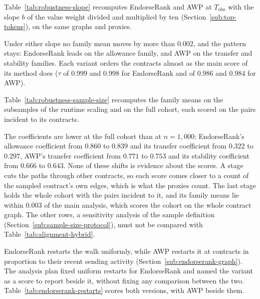 
Table~\ref{tab:robustness-slope} recomputes EndorseRank and AWP at $T_{\mathrm{obs}}$ with the slope $b$ of the value weight divided and multiplied by ten (Section~\ref{sub:top-tokens}), on the same graphs and proxies.



Under either slope no family mean moves by more than $0.002$, and the pattern stays: EndorseRank leads on the allowance family, and AWP on the transfer and stability families. Each variant orders the contracts almost as the main score of its method does ($\tau$ of $0.999$ and $0.998$ for EndorseRank and of $0.986$ and $0.984$ for AWP).


Table~\ref{tab:robustness-sample-size} recomputes the family means on the subsamples of the runtime scaling and on the full cohort, each scored on the pairs incident to its contracts.



The coefficients are lower at the full cohort than at $n=1{,}000$: EndorseRank's allowance coefficient from $0.860$ to $0.839$ and its transfer coefficient from $0.322$ to $0.297$, AWP's transfer coefficient from $0.771$ to $0.753$ and its stability coefficient from $0.666$ to $0.643$. None of these shifts is evidence about the scores. A stage cuts the paths through other contracts, so each score comes closer to a count of the sampled contract's own edges, which is what the proxies count. The last stage holds the whole cohort with the pairs incident to it, and its family means lie within $0.003$ of the main analysis, which scores the cohort on the whole contract graph. The other rows, a sensitivity analysis of the sample definition (Section~\ref{sub:sample-size-protocol}), must not be compared with Table~\ref{tab:alignment-hybrid}.


EndorseRank restarts the walk uniformly, while AWP restarts it at contracts in proportion to their recent sending activity (Section~\ref{sub:endorserank-graph}). The analysis plan fixed uniform restarts for EndorseRank and named the variant as a score to report beside it, without fixing any comparison between the two. Table~\ref{tab:endorserank-restarts} scores both versions, with AWP beside them.

